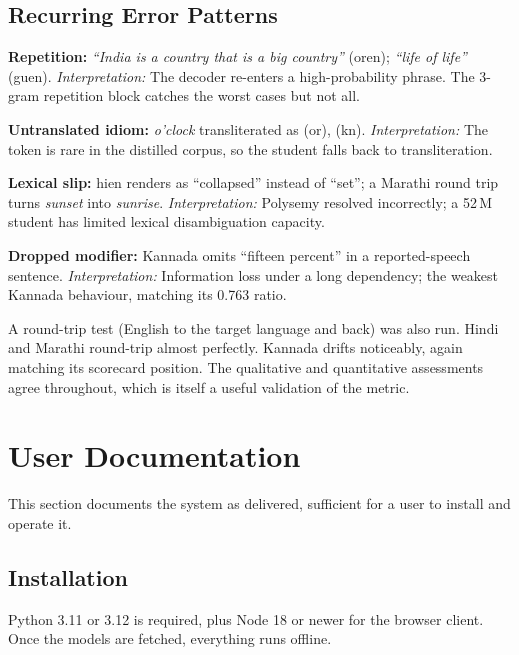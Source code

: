 \subsection{Recurring Error Patterns}
\label{subsec:errors}

\begin{bullets}
\item \textbf{Repetition:} \textit{``India is a country that is a big country''} (or\arrowto{}en); \textit{``life of life''} (gu\arrowto{}en). \emph{Interpretation:} The decoder re-enters a high-probability phrase. The 3-gram repetition block catches the worst cases but not all.
\item \textbf{Untranslated idiom:} \textit{o'clock} transliterated as  (or),  (kn). \emph{Interpretation:} The token is rare in the distilled corpus, so the student falls back to transliteration.
\item \textbf{Lexical slip:} hi\arrowto{}en renders  as ``collapsed'' instead of ``set''; a Marathi round trip turns \textit{sunset} into \textit{sunrise}. \emph{Interpretation:} Polysemy resolved incorrectly; a 52\,M student has limited lexical disambiguation capacity.
\item \textbf{Dropped modifier:} Kannada omits ``fifteen percent'' in a reported-speech sentence. \emph{Interpretation:} Information loss under a long dependency; the weakest Kannada behaviour, matching its 0.763 ratio.
\end{bullets}

A round-trip test (English to the target language and back) was also run.
Hindi and Marathi round-trip almost perfectly. Kannada drifts noticeably, again
matching its scorecard position. The qualitative and quantitative assessments
agree throughout, which is itself a useful validation of the metric.

\section{User Documentation}
\label{sec:userdoc}

This section documents the system as delivered, sufficient for a user to install
and operate it.

\subsection{Installation}
\label{subsec:install}

Python 3.11 or 3.12 is required, plus Node 18 or newer for the browser client.
Once the models are fetched, everything runs offline.

